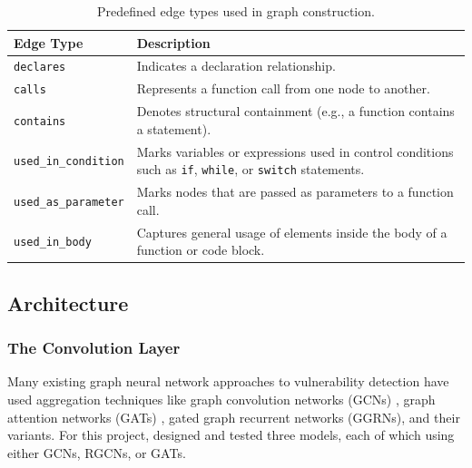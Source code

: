 \documentclass{article}
\begin{document}
\begin{table}[h]
\centering
\begin{tabular}{lp{8cm}}
\hline
\textbf{Edge Type} & \textbf{Description} \\
\hline
\texttt{declares} & Indicates a declaration relationship. \\
\texttt{calls} & Represents a function call from one node to another. \\
\texttt{contains} & Denotes structural containment (e.g., a function contains a statement). \\
\texttt{used\_in\_condition} & Marks variables or expressions used in control conditions such as \texttt{if}, \texttt{while}, or \texttt{switch} statements. \\
\texttt{used\_as\_parameter} & Marks nodes that are passed as parameters to a function call. \\
\texttt{used\_in\_body} & Captures general usage of elements inside the body of a function or code block. \\
\hline
\end{tabular}
\caption{Predefined edge types used in graph construction.}
\label{tab:edgetypes}
\end{table}

\subsection{Architecture}
\subsubsection{The Convolution Layer}
Many existing graph neural network approaches to vulnerability detection have used aggregation techniques like graph convolution networks (GCNs) \cite{gcn}, graph attention networks (GATs) \cite{gat}, gated graph recurrent networks (GGRNs), and their variants. For this project, designed and tested three models, each of which using either GCNs, RGCNs, or GATs.
\end{document}
